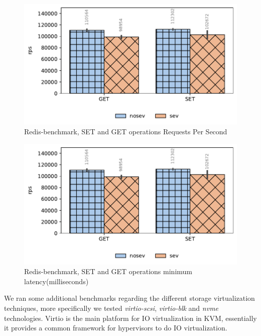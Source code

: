 \documentclass[twocolumn]{article}
\begin{document}
\begin{figure}[ht]
    \centering
    \includegraphics[width=\columnwidth]{img/redis.pdf}
    \caption{Redis-benchmark, SET and GET operations Requests Per Second}
    \label{fig:tb-redis}
\end{figure}

\begin{figure}[ht]
    \centering
    \includegraphics[width=\columnwidth]{img/redis.pdf}
    \caption{Redis-benchmark, SET and GET operations minimum latency(milliseconds)}
    \label{fig:tb-redis-latency}
\end{figure}

We ran some additional benchmarks regarding the different storage virtualization techniques, more specifically we tested \textit{virtio-scsi}, \textit{virtio-blk} and \textit{nvme} technologies. Virtio is the main platform for IO virtualization in KVM, essentially it provides a common framework for hypervisors to do IO virtualization.
\end{document}

